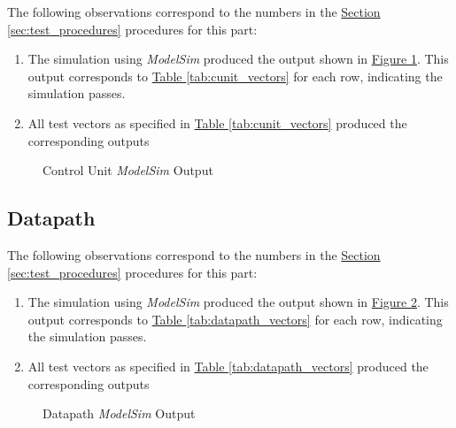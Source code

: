 The following observations correspond to the numbers in the \hyperref[sec:test_procedures]{Section \ref*{sec:test_procedures}} procedures for this part:

\begin{enumerate}
    \item The simulation using \emph{ModelSim} produced the output shown in \hyperref[fig:pcadder_output]{Figure \ref*{fig:cunit_output}}.
    This output corresponds to \hyperref[tab:cunit_vectors]{Table \ref*{tab:cunit_vectors}} for each row, indicating the simulation passes.
    \item All test vectors as specified in \hyperref[tab:cunit_vectors]{Table \ref*{tab:cunit_vectors}} produced the corresponding outputs
\end{enumerate}

\begin{figure}
    \caption{Control Unit \emph{ModelSim} Output\label{fig:cunit_output}}
\end{figure}


\FloatBarrier \subsection{Datapath} %
\label{sub:datapath} \FloatBarrier

The following observations correspond to the numbers in the \hyperref[sec:test_procedures]{Section \ref*{sec:test_procedures}} procedures for this part:

\begin{enumerate}
    \item The simulation using \emph{ModelSim} produced the output shown in \hyperref[fig:datapath_output]{Figure \ref*{fig:datapath_output}}.
    This output corresponds to \hyperref[tab:datapath_vectors]{Table \ref*{tab:datapath_vectors}} for each row, indicating the simulation passes.
    \item All test vectors as specified in \hyperref[tab:datapath_vectors]{Table \ref*{tab:datapath_vectors}} produced the corresponding outputs
\end{enumerate}

\begin{figure}
    \caption{Datapath \emph{ModelSim} Output\label{fig:datapath_output}}
\end{figure}


